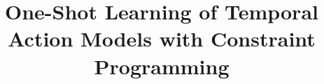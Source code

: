 \documentclass[runningheads]{llncs}
\begin{document}
\title{One-Shot Learning of Temporal Action Models with Constraint Programming}


%

%

\maketitle              %
\end{document}
